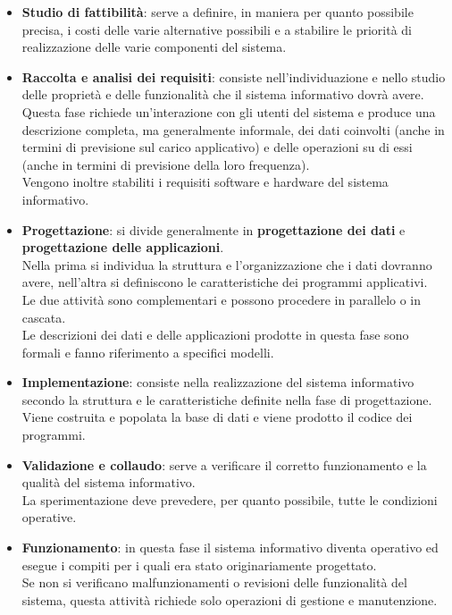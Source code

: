    \begin{itemize}
        \item{\textbf{Studio di fattibilità}: serve a definire, in maniera per quanto possibile precisa, i costi delle varie alternative possibili e a stabilire le priorità di realizzazione delle varie componenti del sistema.}
        \item{\textbf{Raccolta e analisi dei requisiti}: consiste nell'individuazione e nello studio delle proprietà e delle funzionalità che il sistema informativo dovrà avere.\\
        Questa fase richiede un'interazione con gli utenti del sistema e produce una descrizione completa, ma generalmente informale, dei dati coinvolti (anche in termini di previsione sul carico applicativo) e delle operazioni su di essi (anche in termini di previsione della loro frequenza).\\
        Vengono inoltre stabiliti i requisiti software e hardware del sistema informativo.}
        \item{\textbf{Progettazione}: si divide generalmente in \textbf{progettazione dei dati} e \textbf{progettazione delle applicazioni}.\\
        Nella prima si individua la struttura e l'organizzazione che i dati dovranno avere, nell'altra si definiscono le caratteristiche dei programmi applicativi.\\
        Le due attività sono complementari e possono procedere in parallelo o in cascata.\\
        Le descrizioni dei dati e delle applicazioni prodotte in questa fase sono formali e fanno riferimento a specifici modelli.}
        \item{\textbf{Implementazione}: consiste nella realizzazione del sistema informativo secondo la struttura e le caratteristiche definite nella fase di progettazione.\\
        Viene costruita e popolata la base di dati e viene prodotto il codice dei programmi.}
        \item{\textbf{Validazione e collaudo}: serve a verificare il corretto funzionamento e la qualità del sistema informativo.\\
        La sperimentazione deve prevedere, per quanto possibile, tutte le condizioni operative.}
        \item{\textbf{Funzionamento}: in questa fase il sistema informativo diventa operativo ed esegue i compiti per i quali era stato originariamente progettato.\\
        Se non si verificano malfunzionamenti o revisioni delle funzionalità del sistema, questa attività richiede solo operazioni di gestione e manutenzione.}
    \end{itemize}
